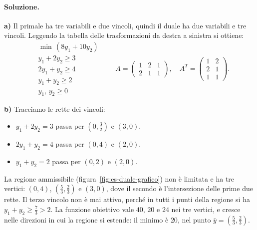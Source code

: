 \paragraph{Soluzione.}
\textbf{a)} Il primale ha tre variabili e due vincoli, quindi il duale ha due variabili e tre vincoli. Leggendo la tabella delle trasformazioni da destra a sinistra si ottiene:
\[
\begin{aligned}
&\min\, (8y_1 + 10y_2) \\
&y_1 + 2y_2 \ge 3 \\
&2y_1 + y_2 \ge 4 \\
&y_1 + y_2 \ge 2 \\
&y_1,\, y_2 \ge 0
\end{aligned}
\qquad
A = \begin{pmatrix} 1 & 2 & 1 \\ 2 & 1 & 1 \end{pmatrix}, \quad
A^T = \begin{pmatrix} 1 & 2 \\ 2 & 1 \\ 1 & 1 \end{pmatrix}.
\]

\textbf{b)} Tracciamo le rette dei vincoli:
\begin{itemize}
    \item $y_1 + 2y_2 = 3$ passa per $(0, \frac32)$ e $(3, 0)$.
    \item $2y_1 + y_2 = 4$ passa per $(0, 4)$ e $(2, 0)$.
    \item $y_1 + y_2 = 2$ passa per $(0, 2)$ e $(2, 0)$.
\end{itemize}
La regione ammissibile (figura~\ref{fig:es-duale-grafico}) non è limitata e ha tre vertici: $(0, 4)$, $(\frac53, \frac23)$ e $(3, 0)$, dove il secondo è l'intersezione delle prime due rette. Il terzo vincolo non è mai attivo, perché in tutti i punti della regione si ha $y_1 + y_2 \ge \frac73 > 2$. La funzione obiettivo vale $40$, $20$ e $24$ nei tre vertici, e cresce nelle direzioni in cui la regione si estende: il minimo è $20$, nel punto $\bar{y} = (\frac53, \frac23)$.

